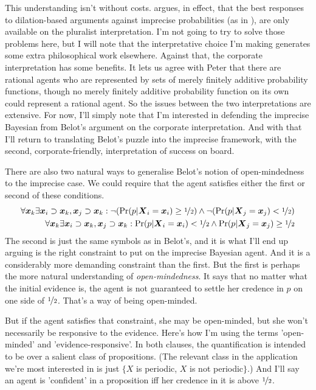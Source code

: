 This understanding isn't without costs. \citet{Bradley2014} argues, in effect, that the best responses to dilation-based arguments against imprecise probabilities (as in \citet{White2010}), are only available on the pluralist interpretation. I'm not going to try to solve those problems here, but I will note that the interpretative choice I'm making generates some extra philosophical work elsewhere. Against that, the corporate interpretation has some benefits. It lets us agree with Peter \citet{Walley1991} that there are rational agents who are represented by sets of merely finitely additive probability functions, though no merely finitely additive probability function on its own could represent a rational agent. So the issues between the two interpretations are extensive. For now, I'll simply note that I'm interested in defending the imprecise Bayesian from Belot's argument on the corporate interpretation. And with that I'll return to translating Belot's puzzle into the imprecise framework, with the second, corporate-friendly, interpretation of success on board.

There are also two natural ways to generalise Belot's notion of open-minded\-ness to the imprecise case. We could require that the agent satisfies either the first or second of these conditions.
%
\begin{align}
\forall \boldsymbol{x}_k \exists \boldsymbol{x}_i \supset \boldsymbol{x}_k, \boldsymbol{x}_j \supset \boldsymbol{x}_k: \neg(\Pr(p | \boldsymbol{X}_i = \boldsymbol{x}_i) \geq \nicefrac{1}{2}) \wedge \neg(\Pr(p | \boldsymbol{X}_j = \boldsymbol{x}_j) < \nicefrac{1}{2}) \\
\forall \boldsymbol{x}_k \exists \boldsymbol{x}_i \supset \boldsymbol{x}_k, \boldsymbol{x}_j \supset \boldsymbol{x}_k: \Pr(p | \boldsymbol{X}_i = \boldsymbol{x}_i) < \nicefrac{1}{2} \wedge \Pr(p | \boldsymbol{X}_j = \boldsymbol{x}_j) \geq \nicefrac{1}{2}
\end{align}
%
The second is just the same symbols as in Belot's, and it is what I'll end up arguing is the right constraint to put on the imprecise Bayesian agent. And it is a considerably more demanding constraint than the first. But the first is perhaps the more natural understanding of \textit{open-mindedness}. It says that no matter what the initial evidence is, the agent is not guaranteed to settle her credence in $p$ on one side of $\nicefrac{1}{2}$. That's a way of being open-minded.

But if the agent satisfies that constraint, she may be open-minded, but she won't necessarily be responsive to the evidence. Here's how I'm using the terms 'open-minded' and 'evidence-responsive'. In both clauses, the quantification is intended to be over a salient class of propositions. (The relevant class in the application we're most interested in is just $\{X$ is periodic, $X$ is not periodic$\}$.) And I'll say an agent is 'confident' in a proposition iff her credence in it is above $\nicefrac{1}{2}$.

